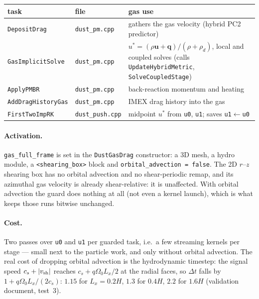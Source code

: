 \documentclass[11pt]{article}
\newcommand{\code}[1]{\texttt{#1}}
\newcommand{\file}[1]{\texttt{\small #1}}
\newcommand{\fn}[1]{\texttt{\small #1}}
\newcommand{\Om}{\Omega_0}
\newcommand{\qom}{q\Om}
\newcommand{\vsh}{v_{\rm sh}}
\begin{document}
\begin{center}\small
\begin{tabular}{lll}
\toprule
task & file & gas use \\
\midrule
\fn{DepositDrag}       & \file{dust\_pm.cpp}   & gathers the gas velocity (hybrid PC2 predictor) \\
\fn{GasImplicitSolve}  & \file{dust\_pm.cpp}   & $u^\ast=(\rho\mathbf{u}+\mathbf{q})/(\rho+\rho_d)$, local
  and coupled solves (calls \fn{UpdateHybridMetric}, \fn{SolveCoupledStage}) \\
\fn{ApplyPMBR}         & \file{dust\_pm.cpp}   & back-reaction momentum and heating \\
\fn{AddDragHistoryGas} & \file{dust\_pm.cpp}   & IMEX drag history into the gas \\
\fn{FirstTwoImpRK}     & \file{dust\_push.cpp} & midpoint $u^\ast$ from \code{u0}, \code{u1}; saves \code{u1}$\leftarrow$\code{u0} \\
\bottomrule
\end{tabular}
\end{center}

\paragraph{Activation.}  \code{gas\_full\_frame} is set in the \fn{DustGasDrag}
constructor: a 3D mesh, a hydro module, a \code{<shearing\_box>} block and
\code{orbital\_advection = false}.  The 2D $r$--$z$ shearing box has no orbital advection
and no shear-periodic remap, and its azimuthal gas velocity is already shear-relative:
it is unaffected.  With orbital advection the guard does nothing at all (not even a
kernel launch), which is what keeps those runs bitwise unchanged.

\paragraph{Cost.}  Two passes over \code{u0} and \code{u1} per guarded task, i.e.\ a few
streaming kernels per stage --- small next to the particle work, and only without orbital
advection.  The real cost of dropping orbital advection is the hydrodynamic timestep:
the signal speed $c_s + |\vsh|$ reaches $c_s + \qom L_x/2$ at the radial faces, so
$\Delta t$ falls by $1 + \qom L_x/(2c_s)$: $1.15$ for $L_x = 0.2H$, $1.3$ for $0.4H$,
$2.2$ for $1.6H$ (validation document, test~3).

\end{document}
